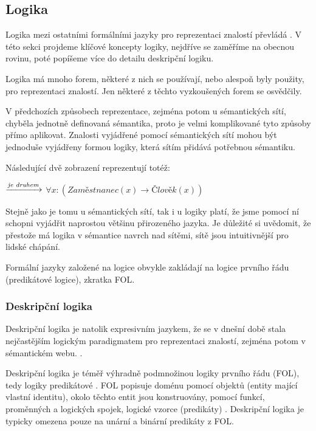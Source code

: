 \subsection{Logika}
Logika mezi ostatními formálními jazyky pro reprezentaci znalostí převládá \cite{Stephan2007}. V této sekci projdeme klíčové koncepty logiky, nejdříve se zaměříme na obecnou rovinu, poté popíšeme více do detailu deskripční logiku.\par
Logika má mnoho forem, některé z nich se používají, nebo alespoň byly použity, pro reprezentaci znalostí. \cite{cite:12} Jen některé z těchto vyzkoušených forem se osvědčily. \par
V předchozích způsobech reprezentace, zejména potom u sémantických sítí, chyběla jednotně definovaná sémantika, proto je velmi komplikované tyto způsoby přímo aplikovat. \cite{Stephan2007} Znalosti vyjádřené pomocí sémantických sítí mohou být jednoduše vyjádřeny formou logiky, která sítím přidává potřebnou sémantiku. \cite{cite:12}\par
\noindent Následující dvě zobrazení reprezentují totéž:\par
\vspace{3mm}
\noindent{} $\xrightarrow{\text{\textit{je druhem}}}$  \indent
$\forall x: (Zaměstnanec(x) \to Člověk(x))$
\par\vspace{4mm}
\noindent Stejně jako je tomu u sémantických sítí, tak i u logiky platí, že jsme pomocí ní schopni vyjádřit naprostou většinu přirozeného jazyka. Je důležité si uvědomit, že přestože má logika v sémantice navrch nad sítěmi, sítě jsou intuitivnější pro lidské chápání. \par
Formální jazyky založené na logice obvykle zakládají na logice prvního řádu (predikátové logice), zkratka FOL.\cite{cite:12}\par

\subsubsection{Deskripční logika}
Deskripční logika je natolik expresivním jazykem, že se v dnešní době stala nejčastějším logickým paradigmatem pro reprezentaci znalostí, zejména potom v sémantickém webu. \cite{Stephan2007}.\par
Deskripční logika je téměř výhradně podmnožinou logiky prvního řádu (FOL), tedy logiky predikátové \cite{Stephan2007}. FOL popisuje doménu pomocí objektů (entity mající vlastní identitu), okolo těchto entit jsou konstruovány, pomocí funkcí, proměnných a logických spojek, logické vzorce (predikáty) \cite{Russell:2009:AIM:1671238}. Deskripční logika je typicky omezena pouze na unární a binární predikáty z FOL. \cite{Stephan2007}\par
